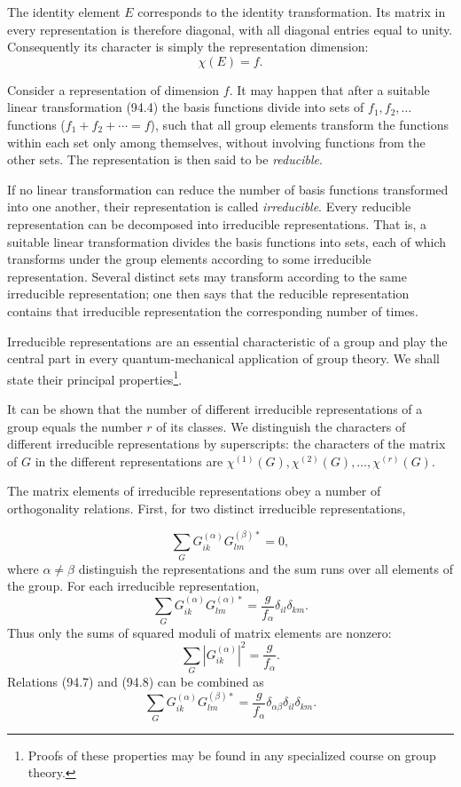 The identity element $E$ corresponds to the identity transformation. Its matrix in every representation is therefore diagonal, with all diagonal entries equal to unity. Consequently its character is simply the representation dimension:
\begin{equation}
 \chi(E)=f.
 \tag{94.6}
\end{equation}

Consider a representation of dimension $f$. It may happen that after a suitable linear transformation (94.4) the basis functions divide into sets of $f_1,f_2,\ldots$ functions ($f_1+f_2+\cdots=f$), such that all group elements transform the functions within each set only among themselves, without involving functions from the other sets. The representation is then said to be \emph{reducible}.

If no linear transformation can reduce the number of basis functions transformed into one another, their representation is called \emph{irreducible}. Every reducible representation can be decomposed into irreducible representations. That is, a suitable linear transformation divides the basis functions into sets, each of which transforms under the group elements according to some irreducible representation. Several distinct sets may transform according to the same irreducible representation; one then says that the reducible representation contains that irreducible representation the corresponding number of times.

Irreducible representations are an essential characteristic of a group and play the central part in every quantum-mechanical application of group theory. We shall state their principal properties\footnote{Proofs of these properties may be found in any specialized course on group theory.}.

It can be shown that the number of different irreducible representations of a group equals the number $r$ of its classes. We distinguish the characters of different irreducible representations by superscripts: the characters of the matrix of $G$ in the different representations are $\chi^{(1)}(G),\chi^{(2)}(G),\ldots,\chi^{(r)}(G)$.

The matrix elements of irreducible representations obey a number of orthogonality relations. First, for two distinct irreducible representations,

\begin{equation}
 \sum_GG_{ik}^{(\alpha)}G_{lm}^{(\beta)*}=0,
 \tag{94.7}
\end{equation}
where $\alpha\ne\beta$ distinguish the representations and the sum runs over all elements of the group. For each irreducible representation,
\begin{equation}
 \sum_GG_{ik}^{(\alpha)}G_{lm}^{(\alpha)*}=\frac{g}{f_\alpha}\delta_{il}\delta_{km}.
 \tag{94.8}
\end{equation}
Thus only the sums of squared moduli of matrix elements are nonzero:
\[
 \sum_G|G_{ik}^{(\alpha)}|^2=\frac{g}{f_\alpha}.
\]
Relations (94.7) and (94.8) can be combined as
\begin{equation}
 \sum_GG_{ik}^{(\alpha)}G_{lm}^{(\beta)*}=\frac{g}{f_\alpha}\delta_{\alpha\beta}\delta_{il}\delta_{km}.
 \tag{94.9}
\end{equation}

